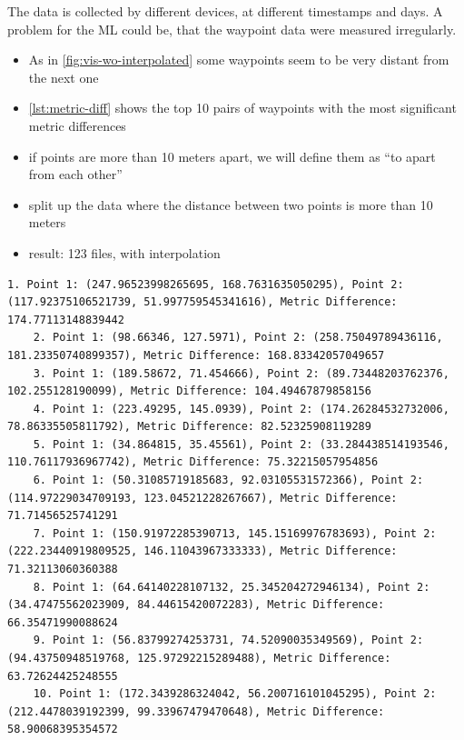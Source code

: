The data is collected by different devices, at different timestamps and days.
A problem for the ML could be, that the waypoint data were measured irregularly.
\begin{itemize}
    \item As in \cref{fig:vis-wo-interpolated} some waypoints seem to be very distant from the next one
    \item \cref{lst:metric-diff} shows the top 10 pairs of waypoints with the most significant metric differences
    \item if points are more than 10 meters apart, we will define them as ``to apart from each other''
    \item split up the data where the distance between two points is more than 10 meters
    \item result: 123 files, with interpolation
\end{itemize}

\begin{lstlisting}[caption={Top 10 pairs with the most significant metric differences},label={lst:metric-diff},captionpos=b]
    1. Point 1: (247.96523998265695, 168.7631635050295), Point 2: (117.92375106521739, 51.997759545341616), Metric Difference: 174.77113148839442
    2. Point 1: (98.66346, 127.5971), Point 2: (258.75049789436116, 181.23350740899357), Metric Difference: 168.83342057049657
    3. Point 1: (189.58672, 71.454666), Point 2: (89.73448203762376, 102.255128190099), Metric Difference: 104.49467879858156
    4. Point 1: (223.49295, 145.0939), Point 2: (174.26284532732006, 78.86335505811792), Metric Difference: 82.52325908119289
    5. Point 1: (34.864815, 35.45561), Point 2: (33.284438514193546, 110.76117936967742), Metric Difference: 75.32215057954856
    6. Point 1: (50.31085719185683, 92.03105531572366), Point 2: (114.97229034709193, 123.04521228267667), Metric Difference: 71.71456525741291
    7. Point 1: (150.91972285390713, 145.15169976783693), Point 2: (222.23440919809525, 146.11043967333333), Metric Difference: 71.32113060360388
    8. Point 1: (64.64140228107132, 25.345204272946134), Point 2: (34.47475562023909, 84.44615420072283), Metric Difference: 66.35471990088624
    9. Point 1: (56.83799274253731, 74.52090035349569), Point 2: (94.43750948519768, 125.97292215289488), Metric Difference: 63.72624425248555
    10. Point 1: (172.3439286324042, 56.200716101045295), Point 2: (212.4478039192399, 99.33967479470648), Metric Difference: 58.90068395354572
\end{lstlisting}


